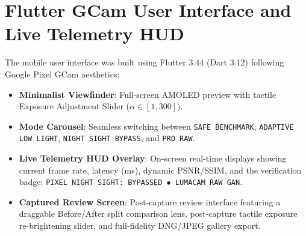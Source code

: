 \section{Flutter GCam User Interface and Live Telemetry HUD}
The mobile user interface was built using Flutter 3.44 (Dart 3.12) following Google Pixel GCam aesthetics:
\begin{itemize}
    \item \textbf{Minimalist Viewfinder}: Full-screen AMOLED preview with tactile Exposure Adjustment Slider ($\alpha \in [1, 300]$).
    \item \textbf{Mode Carousel}: Seamless switching between \texttt{SAFE BENCHMARK}, \texttt{ADAPTIVE LOW LIGHT}, \texttt{NIGHT SIGHT BYPASS}, and \texttt{PRO RAW}.
    \item \textbf{Live Telemetry HUD Overlay}: On-screen real-time displays showing current frame rate, latency (ms), dynamic PSNR/SSIM, and the verification badge: \texttt{PIXEL NIGHT SIGHT: BYPASSED $\bullet$ LUMACAM RAW GAN}.
    \item \textbf{Captured Review Screen}: Post-capture review interface featuring a draggable Before/After split comparison lens, post-capture tactile exposure re-brightening slider, and full-fidelity DNG/JPEG gallery export.
\end{itemize}

